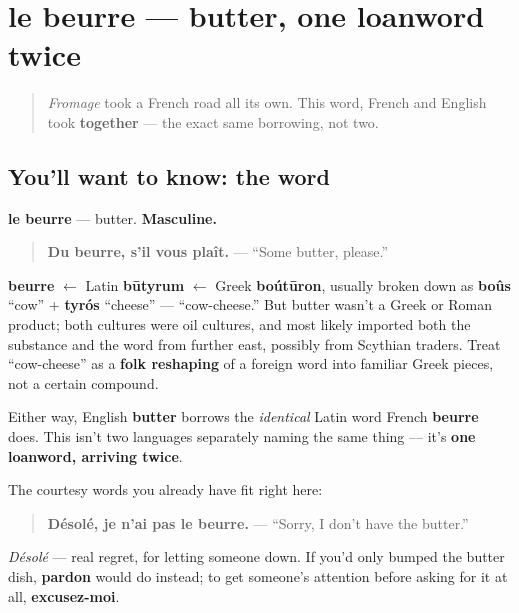 \section[le beurre]{le beurre — butter, one loanword twice}

\label{lesson:FR-C30-beurre}



\begin{quote}
\emph{Fromage} took a French road all its own. This word, French and English took \textbf{together} — the exact same borrowing, not two.
\end{quote}

\subsection*{You'll want to know: the word}
\textbf{le beurre} — butter. \textbf{Masculine.}

\begin{quote}
\textbf{Du beurre, s'il vous plaît.} — \textquotedblleft{}Some butter, please.\textquotedblright{}
\end{quote}

\begin{cousinweb}
\textbf{beurre} $\leftarrow$ Latin \textbf{būtyrum} $\leftarrow$ Greek \textbf{boútūron}, usually broken down as \textbf{boûs} \textquotedblleft{}cow\textquotedblright{} + \textbf{tyrós} \textquotedblleft{}cheese\textquotedblright{} — \textquotedblleft{}cow-cheese.\textquotedblright{} But butter wasn't a Greek or Roman product; both cultures were oil cultures, and most likely imported both the substance and the word from further east, possibly from Scythian traders. Treat \textquotedblleft{}cow-cheese\textquotedblright{} as a \textbf{folk reshaping} of a foreign word into familiar Greek pieces, not a certain compound.

Either way, English \textbf{butter} borrows the \emph{identical} Latin word French \textbf{beurre} does. This isn't two languages separately naming the same thing — it's \textbf{one loanword, arriving twice}.
\end{cousinweb}

\begin{culture}
The courtesy words you already have fit right here:

\begin{quote}
\textbf{Désolé, je n'ai pas le beurre.} — \textquotedblleft{}Sorry, I don't have the butter.\textquotedblright{}
\end{quote}

\emph{Désolé} — real regret, for letting someone down. If you'd only bumped the butter dish, \textbf{pardon} would do instead; to get someone's attention before asking for it at all, \textbf{excusez-moi}.
\end{culture}

